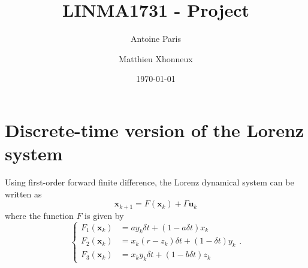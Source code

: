 \documentclass[english, DIV=13]{scrartcl}
\title{LINMA1731 - Project}
\author{Antoine Paris\and Matthieu Xhonneux}
\date{\today}
\renewcommand{\vec}[1]{\mathbf{#1}}
\begin{document}
\maketitle

\section{Discrete-time version of the Lorenz system}
Using first-order forward finite difference, the Lorenz dynamical system can be written as
\[ \vec{x}_{k+1} = F(\vec{x}_k) + \Gamma\vec{u}_k \]
where the function $F$ is given by
\begin{equation*}
    \begin{cases}
        F_1(\vec{x}_k) &= ay_k\delta t + (1-a\delta t)x_k \\
        F_2(\vec{x}_k) &= x_k(r-z_k)\delta t + (1-\delta t)y_k \\
        F_3(\vec{x}_k) &= x_ky_k\delta t + (1-b\delta t)z_k
    \end{cases}.
\end{equation*}
\end{document}
